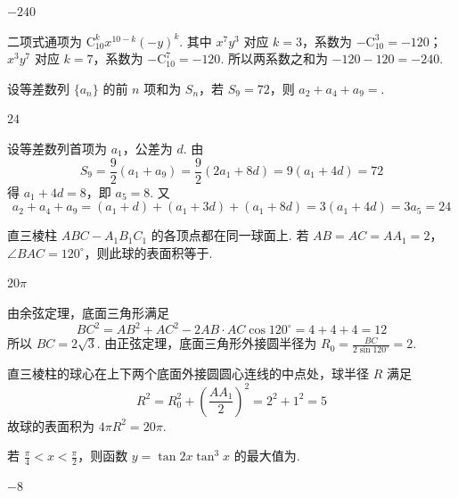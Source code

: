 \begin{answer}
\(-240\)
\end{answer}

\begin{solution}
二项式通项为 \(\mathrm C_{10}^{k}x^{10-k}(-y)^k\). 其中 \(x^7y^3\) 对应 \(k=3\)，系数为
\(-\mathrm C_{10}^{3}=-120\)；\(x^3y^7\) 对应 \(k=7\)，系数为
\(-\mathrm C_{10}^{7}=-120\). 所以两系数之和为 \(-120-120=-240\).
\end{solution}

\begin{problem}
设等差数列 \(\{a_{n}\}\) 的前 \(n\) 项和为 \(S_{n}\)，若 \(S_{9} = 72\)，则 \(a_{2} + a_{4} + a_{9} = \)\fillinblank{}.
\end{problem}

\begin{answer}
\(24\)
\end{answer}

\begin{solution}
设等差数列首项为 \(a_1\)，公差为 \(d\). 由
\[
S_9=\frac{9}{2}(a_1+a_9)=\frac{9}{2}(2a_1+8d)=9(a_1+4d)=72
\]
得 \(a_1+4d=8\)，即 \(a_5=8\). 又
\[
a_2+a_4+a_9=(a_1+d)+(a_1+3d)+(a_1+8d)=3(a_1+4d)=3a_5=24
\]
\end{solution}

\begin{problem}
直三棱柱 \( ABC - A_{1}B_{1}C_{1} \) 的各顶点都在同一球面上. 若 \(AB = AC = AA_{1} = 2\)，\(\angle BAC = 120^{\circ}\)，则此球的表面积等于\fillinblank{}.
\end{problem}

\begin{answer}
\(20\pi\)
\end{answer}

\begin{solution}
由余弦定理，底面三角形满足
\[
BC^2=AB^2+AC^2-2AB\cdot AC\cos120^{\circ}=4+4+4=12
\]
所以 \(BC=2\sqrt3\). 由正弦定理，底面三角形外接圆半径为
\(R_0=\frac{BC}{2\sin120^{\circ}}=2\).

直三棱柱的球心在上下两个底面外接圆圆心连线的中点处，球半径 \(R\) 满足
\[
R^2=R_0^2+\left(\frac{AA_1}{2}\right)^2=2^2+1^2=5
\]
故球的表面积为 \(4\pi R^2=20\pi\).
\end{solution}

\begin{problem}
若 \(\frac{\pi}{4} < x < \frac{\pi}{2}\)，则函数 \(y = \tan 2x \tan^3 x\) 的最大值为\fillinblank{}.
\end{problem}

\begin{answer}
\(-8\)
\end{answer}

